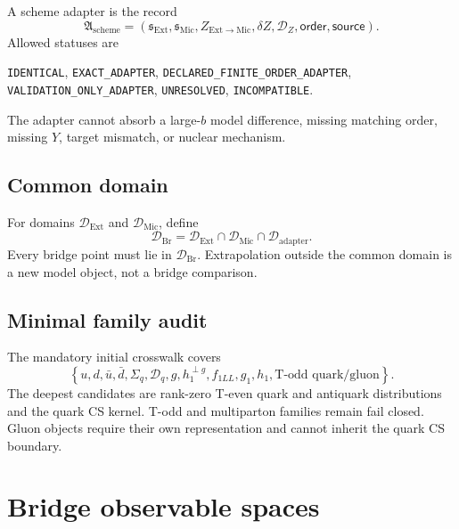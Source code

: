 \documentclass[11pt]{article}
\newcommand{\cD}{\mathcal D}
\newcommand{\Ext}{\ensuremath{\mathrm{Ext}}}
\newcommand{\Mic}{\ensuremath{\mathrm{Mic}}}
\newcommand{\Bridge}{\ensuremath{\mathrm{Br}}}
\begin{document}
A scheme adapter is the record
\begin{equation}
 \mathfrak A_{\mathrm{scheme}}
 =
 \left(
 \mathfrak s_{\Ext},
 \mathfrak s_{\Mic},
 Z_{\Ext\to\Mic},
 \delta Z,
 \mathcal D_Z,
 \mathsf{order},
 \mathsf{source}
 \right).
 \label{eq:scheme-adapter}
\end{equation}
Allowed statuses are
\begin{center}
\texttt{IDENTICAL},
\texttt{EXACT\_ADAPTER},
\texttt{DECLARED\_FINITE\_ORDER\_ADAPTER},
\texttt{VALIDATION\_ONLY\_ADAPTER},
\texttt{UNRESOLVED},
\texttt{INCOMPATIBLE}.
\end{center}
The adapter cannot absorb a large-\(b\) model difference, missing matching order, missing \(Y\), target mismatch, or nuclear mechanism.

\subsection{Common domain}

For domains \(\mathcal D_{\Ext}\) and \(\mathcal D_{\Mic}\), define
\begin{equation}
 \mathcal D_{\Bridge}
 =
 \mathcal D_{\Ext}\cap\mathcal D_{\Mic}\cap\mathcal D_{\mathrm{adapter}}.
 \label{eq:common-domain}
\end{equation}
Every bridge point must lie in \(\mathcal D_{\Bridge}\).  Extrapolation outside the common domain is a new model object, not a bridge comparison.

\subsection{Minimal family audit}

The mandatory initial crosswalk covers
\begin{equation}
 \left\{
 u,d,\bar u,\bar d,\Sigma_q,\cD_q,
 g,h_1^{\perp g},
 f_{1LL},g_1,h_1,
 \text{T-odd quark/gluon}
 \right\}.
 \label{eq:minimal-family}
\end{equation}
The deepest candidates are rank-zero T-even quark and antiquark distributions and the quark CS kernel.  T-odd and multiparton families remain fail closed.  Gluon objects require their own representation and cannot inherit the quark CS boundary.

\section{Bridge observable spaces}
\label{sec:bridge-spaces}
\end{document}
